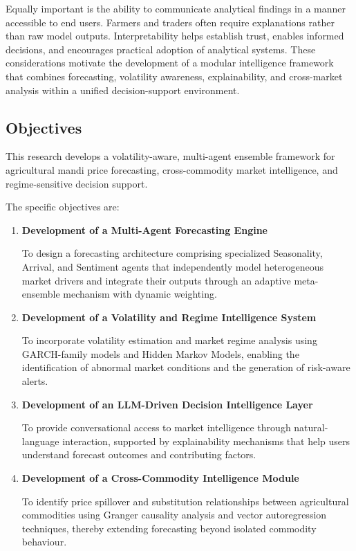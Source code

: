 \documentclass[12pt,a4paper]{report}
\theoremstyle{definition}
\theoremstyle{remark}
\begin{document}
Equally important is the ability to communicate analytical findings in a manner accessible to end users. Farmers and traders often require explanations rather than raw model outputs. Interpretability helps establish trust, enables informed decisions, and encourages practical adoption of analytical systems. These considerations motivate the development of a modular intelligence framework that combines forecasting, volatility awareness, explainability, and cross-market analysis within a unified decision-support environment.

\subsection{Objectives}
\label{subsec:objectives}

This research develops a volatility-aware, multi-agent ensemble framework for agricultural mandi price forecasting, cross-commodity market intelligence, and regime-sensitive decision support.

The specific objectives are:

\begin{enumerate}

\item \textbf{Development of a Multi-Agent Forecasting Engine}

To design a forecasting architecture comprising specialized Seasonality, Arrival, and Sentiment agents that independently model heterogeneous market drivers and integrate their outputs through an adaptive meta-ensemble mechanism with dynamic weighting.

\item \textbf{Development of a Volatility and Regime Intelligence System}

To incorporate volatility estimation and market regime analysis using GARCH-family models and Hidden Markov Models, enabling the identification of abnormal market conditions and the generation of risk-aware alerts.

\item \textbf{Development of an LLM-Driven Decision Intelligence Layer}

To provide conversational access to market intelligence through natural-language interaction, supported by explainability mechanisms that help users understand forecast outcomes and contributing factors.

\item \textbf{Development of a Cross-Commodity Intelligence Module}

To identify price spillover and substitution relationships between agricultural commodities using Granger causality analysis and vector autoregression techniques, thereby extending forecasting beyond isolated commodity behaviour.

\end{enumerate}
\end{document}
